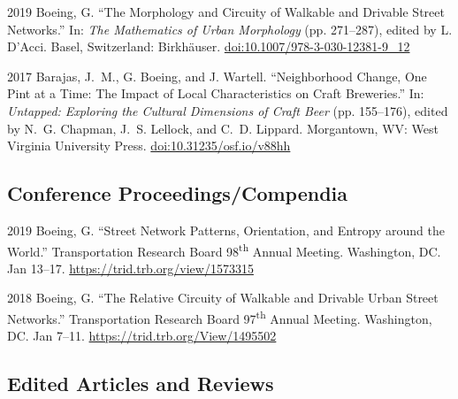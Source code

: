 \documentclass[12pt,letterpaper]{report}
\begin{document}
	\begin{tablist}

		\item[2019] \tab Boeing, G. \enquote{The Morphology and Circuity of Walkable and Drivable Street Networks.} In: \textit{The Mathematics of Urban Morphology} (pp. 271--287), edited by L. D'Acci. Basel, Switzerland: Birkhäuser. \href{https://doi.org/10.1007/978-3-030-12381-9_12}{doi:10.1007/978-3-030-12381-9\_12}

		\item[2017] \tab Barajas, J.~M., G. Boeing, and J. Wartell. \enquote{Neighborhood Change, One Pint at a Time: The Impact of Local Characteristics on Craft Breweries.} In: \textit{Untapped: Exploring the Cultural Dimensions of Craft Beer} (pp. 155--176), edited by N.~G. Chapman, J.~S. Lellock, and C.~D. Lippard. Morgantown, WV: West Virginia University Press. \href{https://doi.org/10.31235/osf.io/v88hh}{doi:10.31235/osf.io/v88hh}

	\end{tablist}



	\subsection*{Conference Proceedings/Compendia}

	\begin{tablist}

		\item[2019] \tab Boeing, G. \enquote{Street Network Patterns, Orientation, and Entropy around the World.} Transportation Research Board 98\textsuperscript{th} Annual Meeting. Washington, DC. Jan 13--17. \href{https://trid.trb.org/view/1573315}{https://trid.trb.org/view/1573315}

		\item[2018] \tab Boeing, G. \enquote{The Relative Circuity of Walkable and Drivable Urban Street Networks.} Transportation Research Board 97\textsuperscript{th} Annual Meeting. Washington, DC. Jan 7--11. \href{https://trid.trb.org/View/1495502}{https://trid.trb.org/View/1495502}

	\end{tablist}



	\subsection*{Edited Articles and Reviews}
\end{document}
